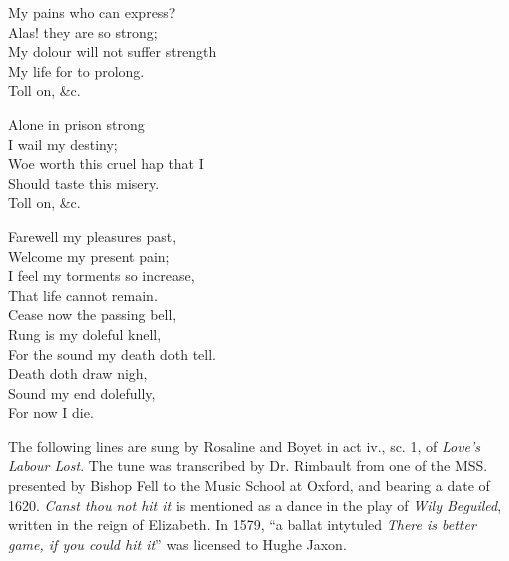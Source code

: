 \settowidth{\versewidth}{My dolour will not suffer strength}
\begin{dcverse}
\begin{patverse}
My pains who can express?\\
Alas! they are so strong;\\
My dolour will not suffer strength\\
My life for to prolong.\\
Toll on, \&c.
\end{patverse}

\begin{patverse}
Alone in prison strong\\
I wail my destiny;\\
Woe worth this cruel hap that I\\
Should taste this misery.\\
Toll on, \&c.
\end{patverse}

\begin{patverse}
Farewell my pleasures past,\\
Welcome my present pain;\\
I feel my torments so increase,\\
That life cannot remain.\\
Cease now the passing bell,\\
Rung is my doleful knell,\\
For the sound my death doth tell.\\
Death doth draw nigh,\\
Sound my end dolefully,\\
For now I die.
\end{patverse}
\end{dcverse}



The following lines are sung by Rosaline and Boyet in act iv., sc. 1, of \textit{Love’s
Labour Lost}. The tune was transcribed by Dr. Rimbault from one of the MSS.
presented by Bishop Fell to the Music School at Oxford, and bearing a date of
1620. \textit{Canst thou not hit it} is mentioned as a dance in the play of \textit{Wily Beguiled},
written in the reign of Elizabeth. In 1579, “a ballat intytuled \textit{There is better
game, if you could hit it}” was licensed to Hughe Jaxon.


